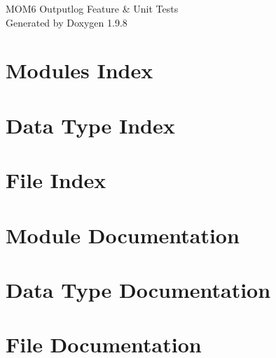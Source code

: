 \documentclass[twoside]{book}
\newcommand{\+}{\discretionary{\mbox{\scriptsize$\hookleftarrow$}}{}{}}
\newcommand{\clearemptydoublepage}{%
    \newpage{\pagestyle{empty}\cleardoublepage}%
  }
\begin{document}
  \raggedbottom
    \hypersetup{pageanchor=false,
                bookmarksnumbered=true,
                pdfencoding=unicode
               }
  \begin{titlepage}
  \vspace*{7cm}
  \begin{center}%
  {\Large MOM6 Outputlog Feature \& Unit Tests}\\
  \vspace*{1cm}
  {\large Generated by Doxygen 1.9.8}\\
  \end{center}
  \end{titlepage}
  \clearemptydoublepage
  \tableofcontents
  \clearemptydoublepage
  \hypersetup{pageanchor=true}


\chapter{Modules Index}

\chapter{Data Type Index}

\chapter{File Index}

\chapter{Module Documentation}

\chapter{Data Type Documentation}







\chapter{File Documentation}










  \backmatter
  \newpage
  \clearemptydoublepage
  \printindex
\end{document}

